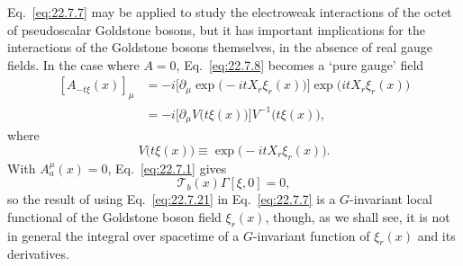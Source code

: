 Eq.~\eqref{eq:22.7.7} may be applied to study the electroweak interactions
of the octet of pseudoscalar Goldstone bosons, but it has important
implications for the interactions of the Goldstone bosons themselves, in
the absence of real gauge fields. In the case where $A=0$,
Eq.~\eqref{eq:22.7.8} becomes a `pure gauge' field
\begin{equation}
 \begin{aligned}
 [A_{-t\xi}(x)]_\mu
 &=-i\bigl[\partial_\mu\exp\bigl(-itX_r\xi_r(x)\bigr)\bigr]
 \exp\bigl(itX_r\xi_r(x)\bigr)
 \\
 &=-i\bigl[\partial_\mu V\bigl(t\xi(x)\bigr)\bigr]
 V^{-1}\bigl(t\xi(x)\bigr),
 \end{aligned}
 \tag{22.7.21}\label{eq:22.7.21}
\end{equation}
where
\begin{equation}
 V\bigl(t\xi(x)\bigr)
 \equiv\exp\bigl(-itX_r\xi_r(x)\bigr).
 \tag{22.7.22}\label{eq:22.7.22}
\end{equation}
With $A_a^\mu(x)=0$, Eq.~\eqref{eq:22.7.1} gives
\begin{equation}
 \mathcal T_b(x)\Gamma[\xi,0]=0,
 \tag{22.7.23}\label{eq:22.7.23}
\end{equation}
so the result of using Eq.~\eqref{eq:22.7.21} in
Eq.~\eqref{eq:22.7.7} is a $G$-invariant local functional of the
Goldstone boson field $\xi_r(x)$, though, as we shall see, it is not in
general the integral over spacetime of a $G$-invariant function of
$\xi_r(x)$ and its derivatives.

